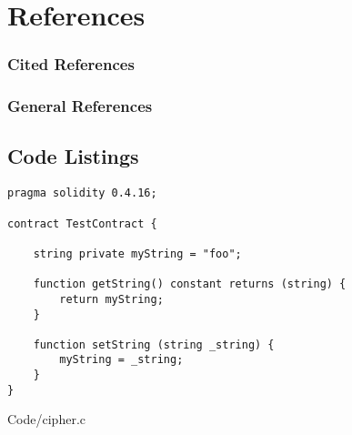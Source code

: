 \documentclass[12pt,tightenlines,letterpaper,listof=totoc]{scrartcl}
\begin{document}

\section{References}
\subsubsection*{Cited References}
\printbibliography[heading=none,category=cited]

\subsubsection*{General References}
\printbibliography[heading=none,notcategory=cited,resetnumbers=true] 
\linespread{1}

\begin{appendices}
\section{Code Listings}
\begin{lstlisting}[language=Solidity,caption=Example of Solidity Code]
pragma solidity 0.4.16;

contract TestContract {
    
	string private myString = "foo";
	
	function getString() constant returns (string) {
	    return myString;
	}
	
	function setString (string _string) {
	    myString = _string;
	}
}
\end{lstlisting}

{Code/cipher.c}

\end{appendices}
\end{document}
